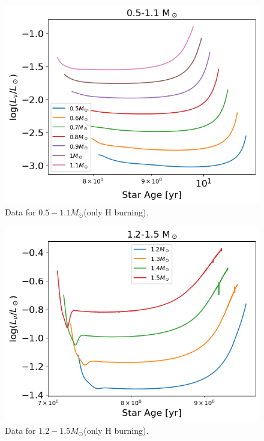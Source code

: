 \begin{figure}[H]
	\centering
	\includegraphics[width=\textwidth]{assets/Data0.5-1.1.png}
	\caption{Data for $0.5-1.1M_\odot$(only H burning).}
	\label{fig:0.5-1.1}
\end{figure}
\begin{figure}[H]
	\centering
	\includegraphics[width=\textwidth]{assets/Data1.2-1.5.png}
	\caption{Data for $1.2-1.5M_\odot$(only H burning).}
	\label{fig:1.2-1.5}
\end{figure}
